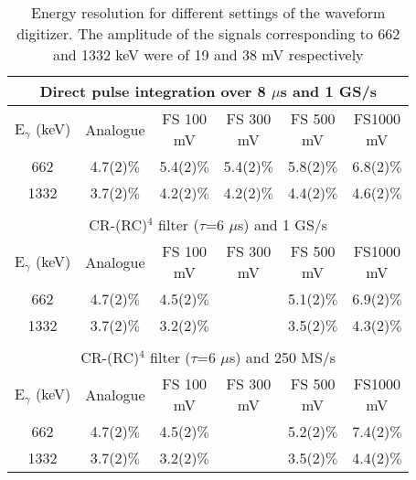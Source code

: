 \documentclass[review,number,sort&compress]{elsarticle}
\begin{document}
\begin{small}
\begin{table}[h!]
\centering
\begin{tabular}{@{} c @{\kern.7em} c @{\kern1em} c @{\kern0.7em} c @{\kern0.7em} c @{\kern0.7em} c @{}} \hline 
\multicolumn{6}{c}{Direct pulse integration over 8 $\mu$s and 1 GS/s} \\ \hline
\makecell{E$_{\gamma}$ \\(keV)} & Analogue & \makecell{FS 100 \\mV} & \makecell{FS 300\\mV} & \makecell{FS 500 \\mV} & \makecell{FS1000 \\mV} \\ \hline
662  & 4.7(2)$\%$ & 5.4(2)$\%$ & 5.4(2)$\%$ & 5.8(2)$\%$ & 6.8(2)$\%$ \\
1332 & 3.7(2)$\%$ & 4.2(2)$\%$ & 4.2(2)$\%$ & 4.4(2)$\%$ & 4.6(2)$\%$ \\ \hline

\\
\multicolumn{6}{c}{CR-(RC)$^{4}$ filter  ($\tau$=6 $\mu$s) and 1 GS/s} \\ \hline
\makecell{E$_{\gamma}$ \\(keV)} & \makecell{Analogue \\} & \makecell{FS 100 \\mV} & \makecell{FS 300\\mV} & \makecell{FS 500 \\mV} & \makecell{FS1000 \\mV} \\ \hline
662  & 4.7(2)$\%$ & 4.5(2)$\%$ &    & 5.1(2)$\%$ & 6.9(2)$\%$ \\
1332 & 3.7(2)$\%$ & 3.2(2)$\%$ &    & 3.5(2)$\%$ & 4.3(2)$\%$ \\ \hline
\\
\multicolumn{6}{c}{CR-(RC)$^{4}$ filter ($\tau$=6 $\mu$s) and 250 MS/s } \\ \hline
\makecell{E$_{\gamma}$ \\(keV)} & \makecell{Analogue \\} & \makecell{FS 100 \\mV} & \makecell{FS 300\\mV} & \makecell{FS 500 \\mV} & \makecell{FS1000 \\mV} \\ \hline
662  & 4.7(2)$\%$ & 4.5(2)$\%$ &    & 5.2(2)$\%$ & 7.4(2)$\%$ \\
1332 & 3.7(2)$\%$ & 3.2(2)$\%$ &    & 3.5(2)$\%$ & 4.4(2)$\%$ \\ \hline

\end{tabular}
\label{tabres} 
\caption{Energy resolution for different settings of the waveform digitizer. The amplitude of the signals corresponding to 662 and 1332 keV were of 19 and 38 mV respectively }
\end{table}

\end{small}
\end{document}
